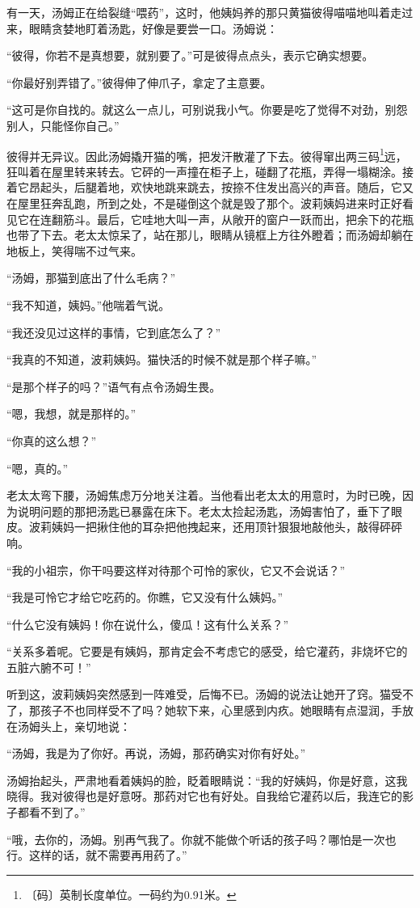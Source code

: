 \documentclass[12pt,UTF-8,openany]{ctexbook}
\begin{document}
\begin{large}
    有一天，汤姆正在给裂缝“喂药”，这时，他姨妈养的那只黄猫彼得喵喵地叫着走过来，眼睛贪婪地盯着汤匙，好像是要尝一口。汤姆说：
    
    “彼得，你若不是真想要，就别要了。”可是彼得点点头，表示它确实想要。
    
    “你最好别弄错了。”彼得伸了伸爪子，拿定了主意要。
    
    “这可是你自找的。就这么一点儿，可别说我小气。你要是吃了觉得不对劲，别怨别人，只能怪你自己。”
    
    彼得并无异议。因此汤姆撬开猫的嘴，把发汗散灌了下去。彼得窜出两三码\footnote{〔码〕英制长度单位。一码约为0.91米。}远，狂叫着在屋里转来转去。它砰的一声撞在柜子上，碰翻了花瓶，弄得一塌糊涂。接着它昂起头，后腿着地，欢快地跳来跳去，按捺不住发出高兴的声音。随后，它又在屋里狂奔乱跑，所到之处，不是碰倒这个就是毁了那个。波莉姨妈进来时正好看见它在连翻筋斗。最后，它哇地大叫一声，从敞开的窗户一跃而出，把余下的花瓶也带了下去。老太太惊呆了，站在那儿，眼睛从镜框上方往外瞪着；而汤姆却躺在地板上，笑得喘不过气来。
    
    “汤姆，那猫到底出了什么毛病？”
    
    “我不知道，姨妈。”他喘着气说。
    
    “我还没见过这样的事情，它到底怎么了？”
    
    “我真的不知道，波莉姨妈。猫快活的时候不就是那个样子嘛。”
    
    “是那个样子的吗？”语气有点令汤姆生畏。
    
    “嗯，我想，就是那样的。”
    
    “你真的这么想？”
    
    “嗯，真的。”
    
    老太太弯下腰，汤姆焦虑万分地关注着。当他看出老太太的用意时，为时已晚，因为说明问题的那把汤匙已暴露在床下。老太太捡起汤匙，汤姆害怕了，垂下了眼皮。波莉姨妈一把揪住他的耳杂把他拽起来，还用顶针狠狠地敲他头，敲得砰砰响。
    
    “我的小祖宗，你干吗要这样对待那个可怜的家伙，它又不会说话？”
    
    “我是可怜它才给它吃药的。你瞧，它又没有什么姨妈。”
    
    “什么它没有姨妈！你在说什么，傻瓜！这有什么关系？”
    
    “关系多着呢。它要是有姨妈，那肯定会不考虑它的感受，给它灌药，非烧坏它的五脏六腑不可！”
    
    听到这，波莉姨妈突然感到一阵难受，后悔不已。汤姆的说法让她开了窍。猫受不了，那孩子不也同样受不了吗？她软下来，心里感到内疚。她眼睛有点湿润，手放在汤姆头上，亲切地说：
    
    “汤姆，我是为了你好。再说，汤姆，那药确实对你有好处。”
    
    汤姆抬起头，严肃地看着姨妈的脸，眨着眼睛说：“我的好姨妈，你是好意，这我晓得。我对彼得也是好意呀。那药对它也有好处。自我给它灌药以后，我连它的影子都看不到了。”
    
    “哦，去你的，汤姆。别再气我了。你就不能做个听话的孩子吗？哪怕是一次也行。这样的话，就不需要再用药了。”
    
\end{large}
\end{document}
